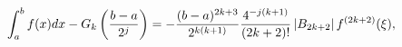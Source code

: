 \[\int_{a}^{b}f(x)dx-G_{k}\left(\frac{b-a}{2^{j}}\right)=-\frac{(b-a)^{2k+3}}{2^%
{k(k+1)}}\frac{4^{-j(k+1)}}{(2k+2)!}\left|\mathop{B_{2k+2}\/}\nolimits\right|f%
^{(2k+2)}(\xi),\]